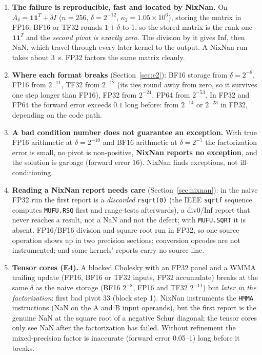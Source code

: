 \documentclass[11pt,a4paper]{article}
\begin{document}
\begin{enumerate}
  \item \textbf{The failure is reproducible, fast and located by NixNan.} On $A_\delta=\mathbf{1}\mathbf{1}^T+\delta I$ ($n=256$, $\delta=2^{-12}$,
  $\kappa_2=1.05\times10^{6}$), storing the matrix in FP16, BF16 or TF32 rounds $1+\delta$ to $1$, so the stored matrix is the rank-one
  $\mathbf{1}\mathbf{1}^T$ and the \emph{second pivot is exactly zero}. The division by it gives Inf, then NaN, which travel through every later kernel to the output.
  A NixNan run takes about 3~s. FP32 factors the same matrix cleanly.
  \item \textbf{Where each format breaks} (Section~\ref{sec:e2}): BF16 storage from $\delta=2^{-8}$, FP16 from $2^{-11}$, TF32 from $2^{-12}$
  (its ties round away from zero, so it survives one step longer than FP16), FP32 from $2^{-24}$, FP64 from $2^{-53}$. In FP32 and FP64 the forward error
  exceeds $0.1$ long before: from $2^{-14}$ or $2^{-23}$ in FP32, depending on the code path.
  \item \textbf{A bad condition number does not guarantee an exception.} With true FP16 arithmetic at $\delta=2^{-10}$ and BF16 arithmetic at $\delta=2^{-7}$
  the factorization error is small, no pivot is non-positive, \textbf{NixNan reports no exception}, and the solution is garbage (forward error $16$).
  NixNan finds exceptions, not ill-conditioning.
  \item \textbf{Reading a NixNan report needs care} (Section~\ref{sec:nixnan}): in the naive FP32 run the first report is a \emph{discarded} \texttt{rsqrt(0)}
  (the IEEE \texttt{sqrtf} sequence computes \texttt{MUFU.RSQ} first and range-tests afterwards), a div0/Inf report that never reaches a result, not a NaN and not the defect;
  with \texttt{MUFU.SQRT} it is absent. FP16/BF16 division and square root run in FP32, so one source operation shows up in two precision sections;
  conversion opcodes are not instrumented; and some kernels' reports carry no source line.
  \item \textbf{Tensor cores (E4).} A blocked Cholesky with an FP32 panel and a WMMA trailing update (FP16, BF16 or TF32 inputs, FP32 accumulate) breaks at the same $\delta$ as the naive storage
  (BF16 $2^{-8}$, FP16 and TF32 $2^{-11}$) but \emph{later in the factorization}: first bad pivot 33 (block step 1). NixNan instruments the \texttt{HMMA} instructions (NaN on the A and B input operands), but the
  first report is the genuine NaN at the square root of a negative Schur diagonal; the tensor cores only see NaN after the factorization has failed. Without refinement the mixed-precision factor is inaccurate (forward error 0.05--1) long before it breaks.

\end{enumerate}
\end{document}

